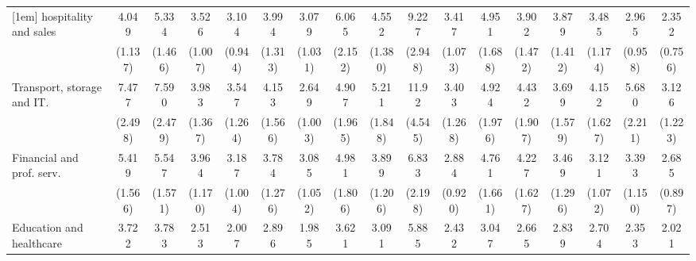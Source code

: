 {\begin{tabular}{l*{16}{c}}
[1em]
hospitality and sales&       4.049\sym{***}&       5.334\sym{***}&       3.526\sym{***}&       3.104\sym{***}&       3.994\sym{***}&       3.079\sym{***}&       6.065\sym{***}&       4.552\sym{***}&       9.227\sym{***}&       3.417\sym{***}&       4.951\sym{***}&       3.902\sym{***}&       3.879\sym{***}&       3.485\sym{***}&       2.965\sym{***}&       2.352\sym{**} \\
                    &     (1.137)         &     (1.466)         &     (1.007)         &     (0.944)         &     (1.313)         &     (1.031)         &     (2.152)         &     (1.380)         &     (2.948)         &     (1.073)         &     (1.688)         &     (1.472)         &     (1.412)         &     (1.174)         &     (0.958)         &     (0.756)         \\
[1em]
Transport, storage and IT.&       7.477\sym{***}&       7.590\sym{***}&       3.983\sym{***}&       3.547\sym{***}&       4.153\sym{***}&       2.649\sym{*}  &       4.907\sym{***}&       5.211\sym{***}&       11.92\sym{***}&       3.403\sym{**} &       4.924\sym{***}&       4.432\sym{***}&       3.699\sym{**} &       4.152\sym{***}&       5.680\sym{***}&       3.126\sym{**} \\
                    &     (2.498)         &     (2.479)         &     (1.367)         &     (1.264)         &     (1.566)         &     (1.003)         &     (1.965)         &     (1.848)         &     (4.545)         &     (1.268)         &     (1.976)         &     (1.907)         &     (1.579)         &     (1.627)         &     (2.211)         &     (1.223)         \\
[1em]
Financial and prof. serv.&       5.419\sym{***}&       5.547\sym{***}&       3.964\sym{***}&       3.187\sym{***}&       3.784\sym{***}&       3.085\sym{***}&       4.981\sym{***}&       3.899\sym{***}&       6.833\sym{***}&       2.884\sym{***}&       4.761\sym{***}&       4.227\sym{***}&       3.469\sym{***}&       3.121\sym{***}&       3.393\sym{***}&       2.685\sym{**} \\
                    &     (1.566)         &     (1.571)         &     (1.170)         &     (1.004)         &     (1.276)         &     (1.052)         &     (1.806)         &     (1.206)         &     (2.198)         &     (0.920)         &     (1.661)         &     (1.627)         &     (1.296)         &     (1.072)         &     (1.150)         &     (0.897)         \\
[1em]
Education and healthcare&       3.722\sym{***}&       3.783\sym{***}&       2.513\sym{**} &       2.007\sym{*}  &       2.896\sym{**} &       1.985\sym{*}  &       3.621\sym{***}&       3.091\sym{***}&       5.885\sym{***}&       2.432\sym{**} &       3.047\sym{**} &       2.665\sym{*}  &       2.839\sym{**} &       2.704\sym{**} &       2.353\sym{*}  &       2.021\sym{*}  \\

\end{tabular}}
